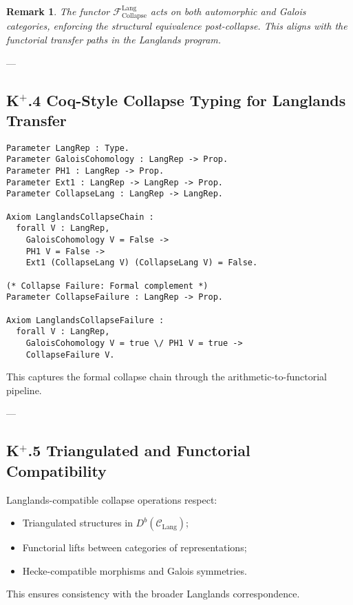 \documentclass[11pt]{article}
\newtheorem{remark}[theorem]{Remark}
\begin{document}
\begin{remark}
The functor \( \mathcal{F}_{\mathrm{Collapse}}^{\mathrm{Lang}} \) acts on both automorphic and Galois categories,  
enforcing the structural equivalence post-collapse. This aligns with the functorial transfer paths in the Langlands program.
\end{remark}

---

\subsection*{K$^{+}$.4 Coq-Style Collapse Typing for Langlands Transfer}

\begin{lstlisting}[language=Coq, mathescape=false]
Parameter LangRep : Type.
Parameter GaloisCohomology : LangRep -> Prop.
Parameter PH1 : LangRep -> Prop.
Parameter Ext1 : LangRep -> LangRep -> Prop.
Parameter CollapseLang : LangRep -> LangRep.

Axiom LanglandsCollapseChain :
  forall V : LangRep,
    GaloisCohomology V = False ->
    PH1 V = False ->
    Ext1 (CollapseLang V) (CollapseLang V) = False.

(* Collapse Failure: Formal complement *)
Parameter CollapseFailure : LangRep -> Prop.

Axiom LanglandsCollapseFailure :
  forall V : LangRep,
    GaloisCohomology V = true \/ PH1 V = true ->
    CollapseFailure V.
\end{lstlisting}

This captures the formal collapse chain through the arithmetic-to-functorial pipeline.

---

\subsection*{K$^{+}$.5 Triangulated and Functorial Compatibility}

Langlands-compatible collapse operations respect:

\begin{itemize}
    \item Triangulated structures in \( D^b(\mathcal{C}_{\mathrm{Lang}}) \);
    \item Functorial lifts between categories of representations;
    \item Hecke-compatible morphisms and Galois symmetries.
\end{itemize}

This ensures consistency with the broader Langlands correspondence.
\end{document}
